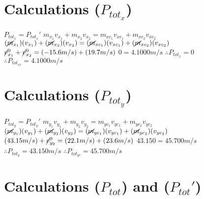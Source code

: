 \documentclass{article}
\begin{document}
\section*{Calculations ($P_{tot_{x}}$)}
$P_{tot_{x}} = P_{tot_{x}}\prime$
\newline\newline
$m_{x_{1}}v_{x_{1}} + m_{x_{2}}v_{x_{2}} = m_{xc_{1}}v_{xc_{1}} + m_{xc_{2}}v_{xc_{2}}$
\newline\newline
$(\cancel{m}_{x_{1}}) (v_{x_{1}}) + (\cancel{m}_{x_{2}})(v_{x_{2}})
    = (\cancel{m}_{xc_{1}})(v_{xc_{1}}) + (\cancel{m}_{xc_{2}})(v_{xc_{2}})$
\newline\newline
$\cancel{v}_{x_{1}}^{0} + \cancel{v}_{x_{2}}^{0} = (-15.6m/s) + (19.7m/s)$
\newline\newline
$0 = 4.1000m/s$
\newline\newline
$\therefore P_{tot_{x}} = 0$
\newline
$\therefore P_{tot_{xc}} = 4.1000m/s$


\section*{Calculations ($P_{tot_{y}}$)}
$P_{tot_{y}} = P_{tot_{y}}\prime$
\newline\newline
$m_{y_{1}}v_{y_{1}} + m_{y_{2}}v_{y_{2}} = m_{yc_{1}}v_{yc_{1}} + m_{yc_{2}}v_{yc_{2}}$
\newline\newline
$(\cancel{m}_{y_{1}}) (v_{y_{1}}) + (\cancel{m}_{y_{2}})(v_{y_{2}})
    = (\cancel{m}_{yc_{1}})(v_{yc_{1}}) + (\cancel{m}_{yc_{2}})(v_{yc_{2}})$
\newline\newline
$(43.15m/s) + \cancel{v}_{y_{2}}^{0} = (22.1m/s) + (23.6m/s)$
\newline\newline
$43.150 = 45.700m/s$
\newline\newline
$\therefore P_{tot_{y}} = 43.150m/s$
\newline
$\therefore P_{tot_{yc}} = 45.700m/s$
\newline

\section*{Calculations ($P_{tot}$) and ($P_{tot}\prime$)}
\end{document}
